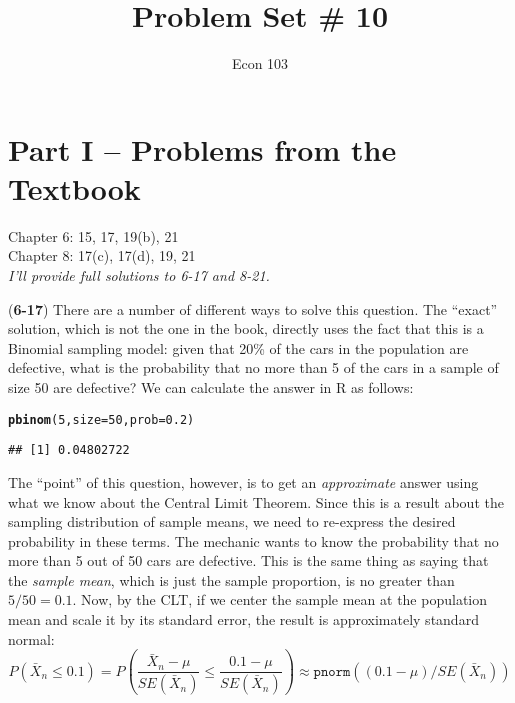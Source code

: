 \documentclass[addpoints,12pt]{exam}\usepackage[]{graphicx}\usepackage[]{color}
\title{Problem Set \# 10}
\author{Econ 103}
\date{}
\makeatletter
\newcommand{\hlnum}[1]{\textcolor[rgb]{0.686,0.059,0.569}{#1}}%
\newcommand{\hlstd}[1]{\textcolor[rgb]{0.345,0.345,0.345}{#1}}%
\newcommand{\hlkwc}[1]{\textcolor[rgb]{0.333,0.667,0.333}{#1}}%
\newcommand{\hlkwd}[1]{\textcolor[rgb]{0.737,0.353,0.396}{\textbf{#1}}}%
\newenvironment{kframe}{%
 \def\at@end@of@kframe{}%
 \ifinner\ifhmode%
  \def\at@end@of@kframe{\end{minipage}}%
  \begin{minipage}{\columnwidth}%
 \fi\fi%
 \def\FrameCommand##1{\hskip\@totalleftmargin \hskip-\fboxsep
 \colorbox{shadecolor}{##1}\hskip-\fboxsep
     \hskip-\linewidth \hskip-\@totalleftmargin \hskip\columnwidth}%
 \MakeFramed {\advance\hsize-\width
   \@totalleftmargin\z@ \linewidth\hsize
   \@setminipage}}%
 {\par\unskip\endMakeFramed%
 \at@end@of@kframe}
\newenvironment{knitrout}{}{} %
\makeatother
\begin{document}
\maketitle


\section*{Part I -- Problems from the Textbook}
 Chapter 6: 15, 17, 19(b), 21\\
 Chapter 8: 17(c), 17(d), 19, 21\\

\noindent \emph{I'll provide full  solutions to 6-17 and 8-21.}

\begin{questions}
  \item[]
  \begin{solution} (\textbf{6-17})
  There are a number of different ways to solve this question. The ``exact'' solution, which is not the one in the book, directly uses the fact that this is a Binomial sampling model: given that 20\% of the cars in the population are defective, what is the probability that no more than 5 of the cars in a sample of size 50 are defective? We can calculate the answer in R as follows:
\begin{knitrout}
\color{fgcolor}\begin{kframe}
\begin{alltt}
\hlkwd{pbinom}\hlstd{(}\hlnum{5}\hlstd{,} \hlkwc{size} \hlstd{=} \hlnum{50}\hlstd{,} \hlkwc{prob} \hlstd{=} \hlnum{0.2}\hlstd{)}
\end{alltt}
\begin{verbatim}
## [1] 0.04802722
\end{verbatim}
\end{kframe}
\end{knitrout}
The ``point'' of this question, however, is to get an \emph{approximate} answer using what we know about the Central Limit Theorem. Since this is a result about the sampling distribution of sample means, we need to re-express the desired probability in these terms. The mechanic wants to know the probability that no more than 5 out of 50 cars are defective. This is the same thing as saying that the \emph{sample mean}, which is just the sample proportion, is no greater than $5/50 = 0.1$. Now, by the CLT, if we center the sample mean at the population mean and scale it by its standard error, the result is approximately standard normal:
$$P(\bar{X}_n \leq 0.1) = P\left(\frac{\bar{X}_n - \mu}{SE(\bar{X}_n)} \leq \frac{0.1 - \mu}{SE(\bar{X}_n)} \right) \approx \texttt{pnorm}((0.1 - \mu)/SE(\bar{X}_n) )$$

\end{solution}
\end{questions}
\end{document}
